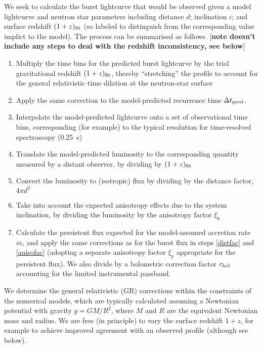 \documentclass{aastex63}
\begin{document}
We seek to calculate the burst lightcurve that would be observed given a model lightcurve and neutron star parameters including distance $d$; inclination $i$; and surface redshift $(1+z)_{\rm fit}$ (so labeled to distinguish from the corresponding value implict to the model). The process can be summarised as follows. [{\bf note doesn't include any steps to deal with the redshift inconsistency, see below}]
\begin{enumerate}
\item Multiply the time bins for the predicted burst lightcurve by the trial gravitational redshift $(1+z)_{\rm fit}$, thereby ``stretching'' the profile to account for the general relativistic time dilation at the neutron-star surface
\item Apply the same correction to the model-predicted recurrence time $\Delta t_{\rm pred}$.
\item Interpolate the model-predicted lightcurve onto a set of observational time bins, corresponding (for example) to the typical resolution for time-resolved spectroscopy (0.25~s)
\item Translate the model-predicted luminosity to the corresponding quantity measured by a distant observer, by 
dividing by $(1+z)_{\rm fit}$
\item Convert the luminosity to (isotropic) flux by dividing by the distance factor, $4\pi d^2$ \label{distfac}
\item Take into account the expected anisotropy effects due to the system inclination, by dividing the luminosity by the anisotropy factor $\xi_b$ \label{anisofac}
\item Calculate the persistent flux expected for the model-assumed accretion rate $\dot{m}$, and apply the same corrections as for the burst flux in steps \ref{distfac} and \ref{anisofac} (adopting a separate anisotropy factor $\xi_p$ appropriate for the persistent flux). We also divide by a bolometric correction factor $c_{\rm bol}$ accounting for the limited instrumental passband.
\end{enumerate}

We determine the general relativistic (GR) corrections within the constraints of the numerical models, which are typically calculated assuming a Newtonian potential with gravity $g=GM/R^2$, where $M$ and $R$ are the equivalent Newtonian mass and radius.
%
We are free (in principle) to vary the surface redshift $1+z$, for example to achieve improved agreement with an observed profile (although see below). 
\end{document}
